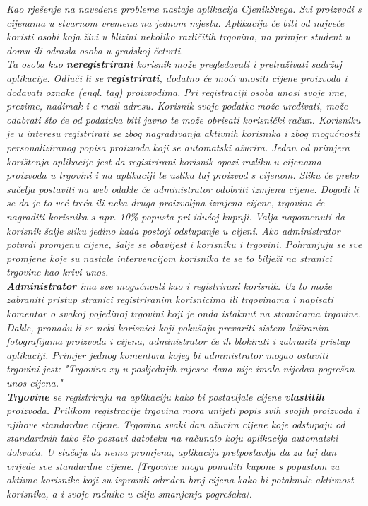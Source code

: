 		\textit{Kao rješenje na navedene probleme nastaje aplikacija CjenikSvega. Svi proizvodi s cijenama u stvarnom vremenu na jednom mjestu. Aplikacija će biti od najveće koristi osobi koja živi u blizini nekoliko različitih trgovina, na primjer student u domu ili odrasla osoba u gradskoj četvrti.}\\
		
		\textit{Ta osoba kao \textbf{neregistrirani} korisnik može pregledavati i pretraživati sadržaj aplikacije. Odluči li se \textbf{registrirati}, dodatno će moći unositi cijene proizvoda i dodavati oznake (engl. tag) proizvodima. Pri registraciji osoba unosi svoje ime, prezime, nadimak i e-mail adresu. Korisnik svoje podatke može uređivati, može odabrati što će od podataka biti javno te može obrisati korisnički račun. Korisniku je u interesu registrirati se zbog nagrađivanja aktivnih korisnika i zbog mogućnosti personaliziranog popisa proizvoda koji se automatski ažurira. Jedan od primjera korištenja aplikacije jest da registrirani korisnik opazi razliku u cijenama proizvoda u trgovini i na aplikaciji te uslika taj proizvod s cijenom. Sliku će preko sučelja postaviti na web odakle će administrator odobriti izmjenu cijene. Dogodi li se da je to već treća ili neka druga proizvoljna izmjena cijene, trgovina će nagraditi korisnika s npr. 10\% popusta pri idućoj kupnji. Valja napomenuti da korisnik šalje sliku jedino kada postoji odstupanje u cijeni. Ako administrator potvrdi promjenu cijene, šalje se obavijest i korisniku i trgovini. Pohranjuju se sve promjene koje su nastale intervencijom korisnika te se to bilježi na stranici trgovine kao krivi unos.}\\
		
		\textit{\textbf{Administrator} ima sve mogućnosti kao i registrirani korisnik. Uz to može zabraniti pristup stranici registriranim korisnicima ili trgovinama i napisati komentar o svakoj pojedinoj trgovini koji je onda istaknut na stranicama trgovine. Dakle, 
pronađu li se neki korisnici koji pokušaju prevariti sistem lažiranim fotografijama proizvoda i cijena, administrator će ih blokirati i zabraniti pristup aplikaciji. Primjer jednog komentara kojeg bi administrator mogao ostaviti trgovini jest: "Trgovina xy u posljednjih mjesec dana nije imala nijedan pogrešan unos cijena."}\\
		
		\textit{\textbf{Trgovine} se registriraju na aplikaciju kako bi postavljale cijene \textbf{vlastitih} proizvoda. Prilikom registracije trgovina mora unijeti popis svih svojih proizvoda i njihove standardne cijene. Trgovina svaki dan ažurira cijene koje odstupaju od standardnih tako što postavi datoteku na računalo koju aplikacija automatski dohvaća. U slučaju da nema promjena, aplikacija pretpostavlja da za taj dan vrijede sve standardne cijene. [Trgovine mogu ponuditi kupone s popustom za aktivne korisnike koji su ispravili određen broj cijena kako bi potaknule aktivnost korisnika, a i svoje radnike u cilju smanjenja pogrešaka].}\\
		
